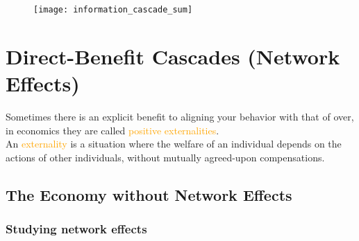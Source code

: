 \begin{figure}[H]
    \centering
    \texttt{[image: information\_cascade\_sum]}
\end{figure}

\chapter{Direct-Benefit Cascades (Network Effects)}

Sometimes there is an explicit benefit to aligning your behavior with that of over, in economics they are called \textcolor{orange}{positive externalities}.\\
An \textcolor{orange}{externality} is a situation where the welfare of an individual depends on the actions of other individuals, without mutually agreed-upon compensations.

\section{The Economy without Network Effects}

\subsection{Studying network effects}

